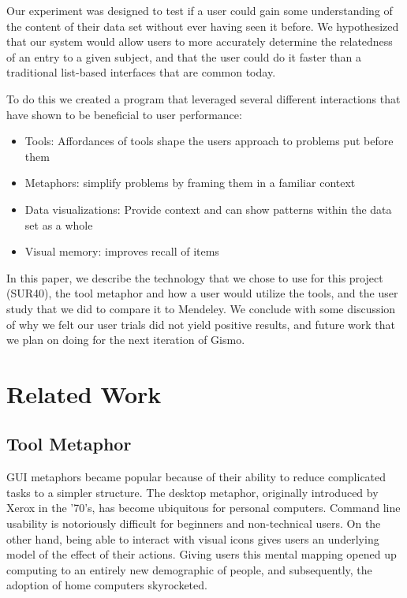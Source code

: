 \documentclass{article}
\begin{document}
Our experiment was designed to test if a user could gain some understanding of the content of their data set without ever having seen it before.  We hypothesized that our system would allow users to more accurately determine the relatedness of an entry to a given subject, and that the user could do it faster than a traditional list-based interfaces that are common today.  

To do this we created a program that leveraged several different interactions that have shown to be beneficial to user performance:
\begin{itemize}
\item{Tools: Affordances of tools shape the users approach to problems put before them}
\item{Metaphors: simplify problems by framing them in a familiar context}
\item{Data visualizations: Provide context and can show patterns within the data set as a whole}
\item{Visual memory: improves recall of items}
\end{itemize}

In this paper, we describe the technology that we chose to use for this project (SUR40), the tool metaphor and how a user would utilize the tools, and the user study that we did to compare it to Mendeley.  We conclude with some discussion of why we felt our user trials did not yield positive results, and future work that we plan on doing for the next iteration of Gismo.


\section{Related Work} 
\subsection{Tool Metaphor}

GUI metaphors became popular because of their ability to reduce complicated tasks to a simpler structure.  %
The desktop metaphor, originally introduced by Xerox in the '70's, has become ubiquitous for personal computers.  Command line usability is notoriously difficult for beginners and non-technical users.  On the other hand, being able to interact with visual icons gives users an underlying model of the effect of their actions.  Giving users this mental mapping opened up computing to an entirely new demographic of people, and subsequently, the adoption of home computers skyrocketed.  
\end{document}
